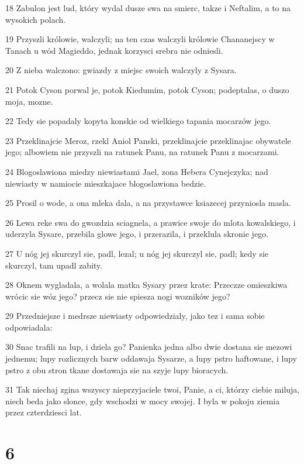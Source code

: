 \par 18 Zabulon jest lud, który wydal dusze swa na smierc, takze i Neftalim, a to na wysokich polach.
\par 19 Przyszli królowie, walczyli; na ten czas walczyli królowie Chananejscy w Tanach u wód Magieddo, jednak korzysci srebra nie odniesli.
\par 20 Z nieba walczono: gwiazdy z miejsc swoich walczyly z Sysara.
\par 21 Potok Cyson porwal je, potok Kiedumim, potok Cyson; podeptalas, o duszo moja, mozne.
\par 22 Tedy sie popadaly kopyta konskie od wielkiego tapania mocarzów jego.
\par 23 Przeklinajcie Meroz, rzekl Aniol Panski, przeklinajcie przeklinajac obywatele jego; albowiem nie przyszli na ratunek Panu, na ratunek Panu z mocarzami.
\par 24 Blogoslawiona miedzy niewiastami Jael, zona Hebera Cynejczyka; nad niewiasty w namiocie mieszkajace blogoslawiona bedzie.
\par 25 Prosil o wode, a ona mleka dala, a na przystawce ksiazecej przyniosla masla.
\par 26 Lewa reke swa do gwozdzia sciagnela, a prawice swoje do mlota kowalskiego, i uderzyla Sysare, przebila glowe jego, i przerazila, i przeklula skronie jego.
\par 27 U nóg jej skurczyl sie, padl, lezal; u nóg jej skurczyl sie, padl; kedy sie skurczyl, tam upadl zabity.
\par 28 Oknem wygladala, a wolala matka Sysary przez krate: Przeczze omieszkiwa wrócic sie wóz jego? przecz sie nie spiesza nogi wozników jego?
\par 29 Przedniejsze i medrsze niewiasty odpowiedzialy, jako tez i sama sobie odpowiadala:
\par 30 Snac trafili na lup, i dziela go? Panienka jedna albo dwie dostana sie mezowi jednemu; lupy rozlicznych barw oddawaja Sysarze, a lupy pstro haftowane, i lupy pstro z obu stron tkane dostawaja sie na szyje lupy bioracych.
\par 31 Tak niechaj zgina wszyscy nieprzyjaciele twoi, Panie, a ci, którzy ciebie miluja, niech beda jako slonce, gdy wschodzi w mocy swojej. I byla w pokoju ziemia przez czterdziesci lat.

\chapter{6}

